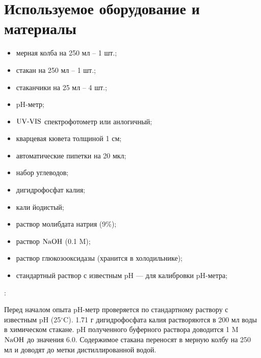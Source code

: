 \documentclass[a4paper]{article}
\begin{document}
\section{\LARGE \textbf{Используемое оборудование и материалы}}
\par \hspace{0.33 cm}
\textbf{}
    \begin{itemize}
        \item мерная колба на 250 мл -- 1 шт.;
        \item стакан на 250 мл -- 1 шт.;
        \item стаканчики на 25 мл -- 4 шт.;
        \item pH-метр;
        \item $\rm UV\text{-}VIS$ спектрофотометр или анлогичный;
        \item кварцевая кювета толщиной 1 см;
        \item автоматические пипетки на 20 мкл;
        \end{itemize}  
\par \vspace{0.3 cm}

\textbf{}
    \begin{itemize}
        \item набор углеводов;
        \item дигидрофосфат калия;
        \item кали йодистый;
        \item раствор молибдата натрия (9\%);
        \item раствор $\rm NaOH$ (0.1 M);
        \item раствор глюкозооксидазы (хранится в холодильнике);
        \item стандартный раствор с известным pH --- для калибровки pH-метра;
        \end{itemize}  
\par \vspace{0.3 cm}

 \hspace{0.1 cm} \textbf{}: \normalfont \par \vspace{0.1 cm}
Перед началом опыта pH-метр проверяется по стандартному раствору с известным pH (25$^{\circ}$C). 1.71 г дигидрофосфата калия растворяются в 200 мл воды в химическом стакане. pH полученного буферного раствора доводится 1 M $\rm NaOH$ до значения 6.0. Содержимое стакана переносят в мерную колбу на 250 мл и доводят до метки дистиллированной водой. 
\par \vspace{0.5 cm}
\end{document}
